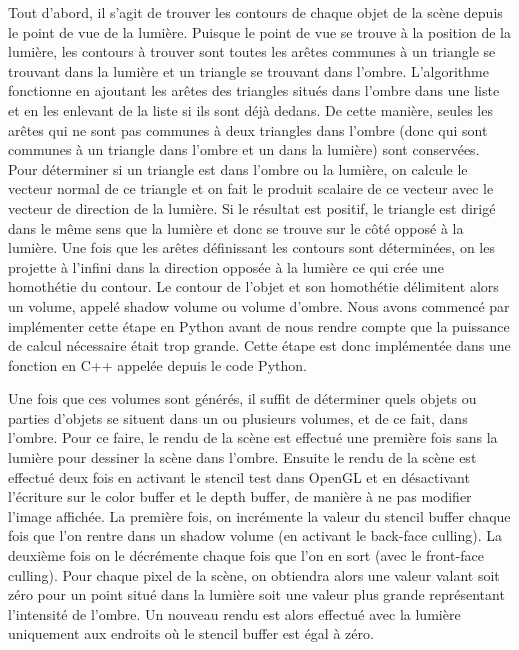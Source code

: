 \documentclass[a4paper,10pt]{report}
\begin{document}
Tout d'abord, il s'agit de trouver les contours de chaque objet de la scène depuis le point de vue de la lumière. 
Puisque le point de vue se trouve à la position de la lumière, les contours à trouver sont toutes les arêtes communes à un triangle se trouvant dans la lumière et un triangle se trouvant dans l'ombre. 
L'algorithme fonctionne en ajoutant les ar\^etes des triangles situés dans l'ombre dans une liste et en les enlevant de la liste si ils sont déjà dedans.
De cette manière, seules les arêtes qui ne sont pas communes à deux triangles dans l'ombre (donc qui sont communes à un triangle dans l'ombre et un dans la lumière) sont conservées.
Pour déterminer si un triangle est dans l'ombre ou la lumière, on calcule le vecteur normal de ce triangle et on fait le produit scalaire de ce vecteur avec le vecteur de direction de la lumière. Si le résultat est positif, le triangle est dirigé dans le même sens que la lumière et donc se trouve sur le c\^oté opposé à la lumière.
Une fois que les ar\^etes définissant les contours sont déterminées, on les projette à l'infini dans la direction opposée à la lumière ce qui crée une homothétie du contour. Le contour de l'objet et son homothétie délimitent alors un volume, appelé shadow volume ou volume d'ombre. 
Nous avons commencé par implémenter cette étape en Python avant de nous rendre compte que la puissance de calcul nécessaire était trop grande.
Cette étape est donc implémentée dans une fonction en C++ appelée depuis le code Python.

Une fois que ces volumes sont générés, il suffit de déterminer quels objets ou parties d'objets se situent dans un ou plusieurs volumes, et de ce fait, dans l'ombre. 
Pour ce faire, le rendu de la scène est effectué une première fois sans la lumière pour dessiner la scène dans l'ombre.
Ensuite le rendu de la scène est effectué deux fois en activant le stencil test dans OpenGL et en désactivant l'écriture sur le color buffer et le depth buffer, de manière à ne pas modifier l'image affichée. La première fois, on incrémente la valeur du stencil buffer chaque fois que l'on rentre dans un shadow volume (en activant le back-face culling). La deuxième fois on le décrémente chaque fois que l'on en sort (avec le front-face culling). Pour chaque pixel de la scène, on obtiendra alors une valeur valant soit zéro pour un point situé dans la lumière soit une valeur plus grande représentant l'intensité de l'ombre.
Un nouveau rendu est alors effectué avec la lumière uniquement aux endroits où le stencil buffer est égal à zéro.
\end{document}
